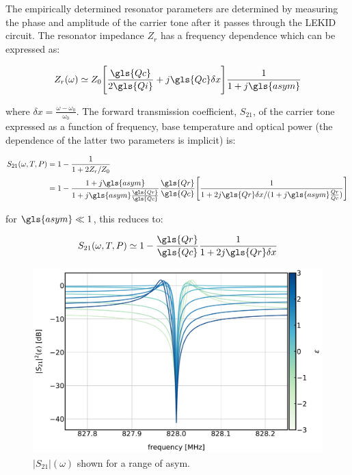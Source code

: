 The empirically determined resonator parameters are determined by measuring the phase and amplitude of the carrier tone after it passes through the LEKID circuit. The resonator impedance  $Z_{r}$ has a frequency dependence which can be expressed as:

\begin{equation}
  Z_{r}(\omega) \simeq Z_{0}\Bigg[ \frac{\gls{Qc}}{2\gls{Qi}} + j\gls{Qc}\delta x \Bigg] \frac{1}{1 + j\gls{asym}}
\end{equation}

where $\delta x = \frac{\omega - \omega_{0}}{\omega_{0}}$. The forward transmission coefficient, $S_{21}$, of the carrier tone expressed as a function of frequency, base temperature and optical power (the dependence of the latter two parameters is implicit) is:

\begin{equation}\label{eq:S21_Z}
  \begin{aligned}
  S_{21}(\omega, T, P) &= 1 - \frac{1}{1 + 2Z_{r}/Z_{0}} \\
                 &= 1 - \frac{1 + j\gls{asym}}{1 + j\gls{asym} \frac{\gls{Qr}}{\gls{Qc}}}\frac{\gls{Qr}}{\gls{Qc}}\Bigg[ \frac{1}{1 + 2j\gls{Qr}\delta x / ( 1 + j\gls{asym}\frac{Qr}{Qc}) }  \Bigg]
  \end{aligned}
\end{equation}

for $\gls{asym} \ll 1$, this reduces to:

\begin{equation}\label{eq:S21}
  S_{21}(\omega, T, P) \simeq 1 - \frac{\gls{Qr}}{\gls{Qc}}\frac{1}{1 + 2j\gls{Qr}\delta x}
\end{equation}

\begin{figure}[!htbp]
  \centering
  \includegraphics[width=\textwidth]{figures/kid_model/S21_eps}
  \caption[ for a range of asymmetry parameters.]{$\left| S_{21} \right|(\omega)$ shown for a range of \gls{asym}.}
\label{fig:S21_eps}
\end{figure}

